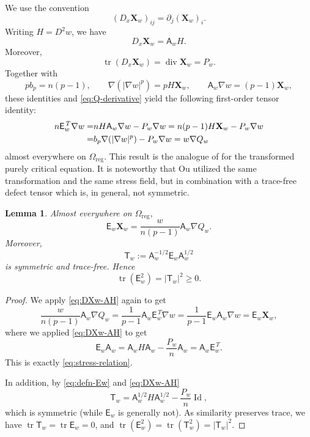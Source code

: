 \documentclass[reqno,12pt]{amsart}
\numberwithin{equation}{section}
\newtheorem{lem}[thm]{Lemma}
\theoremstyle{remark}
\newcommand{\tr}{\operatorname{tr}}
\newcommand{\Id}{\operatorname{Id}}
\newcommand{\Xbf}{\mathbf X}
\begin{document}
We use the convention
$$
(D_x\Xbf_w)_{ij}=\partial_j(\Xbf_w)_i.
$$
Writing $H=D^2w$, we have
\begin{equation}\label{eq:DXw-AH}
D_x\Xbf_w=\mathsf A_w H.
\end{equation}
Moreover,
$$
\operatorname{tr}(D_x\Xbf_w) =\operatorname{div}\Xbf_w=P_w.
$$
Together with
$$
p b_p=n(p-1),\qquad \nabla(|\nabla w|^p)=pH\Xbf_w,\qquad
\mathsf A_w\nabla w=(p-1)\Xbf_w,
$$
these identities and \eqref{eq:Q-derivative} yield the following first-order tensor identity:
\begin{align}
n\mathsf E_w^{\,T}\nabla w = & {} n H \mathsf A_w \nabla w-P_w\nabla w =n(p-1)H\Xbf_w -P_w\nabla w \notag\\
= & {} b_p \nabla(|\nabla w|^p)-P_w\nabla w  ={w}\nabla Q_w \label{eq:Ou-form}
\end{align}
almost everywhere on $\Omega_{\mathrm{reg}}$.
This result is the analogue of \cite[Lemma 2.1 (i)]{O2025} for the transformed purely critical equation. It is noteworthy that Ou utilized the same transformation and the same stress field, but in combination with a trace-free defect tensor which is, in general, not symmetric.

\begin{lem} \label{lem:stress-relation}
Almost everywhere on $\Omega_{\mathrm{reg}}$,
\begin{equation}\label{eq:stress-relation}
\mathsf E_w\Xbf_w =\frac{w}{n(p-1)}\mathsf A_w\nabla Q_w.
\end{equation}
Moreover,
\begin{equation}\label{eq:defn-Tw}
\mathsf T_w:=\mathsf A_w^{-1/2} \mathsf E_w\mathsf A_w^{1/2}
\end{equation}
is symmetric and trace-free.  Hence
\begin{equation}\label{eq:E-square-positive}
\tr(\mathsf E_w^2)=|\mathsf T_w|^2\ge0.
\end{equation}
\end{lem}
\begin{proof}
We apply  \eqref{eq:DXw-AH} again to get
$$
\frac{w}{n(p-1)}\mathsf A_w\nabla Q_w
= \frac1{p-1} \mathsf A_w\mathsf E_w^{\,T}\nabla w
= \frac1{p-1} \mathsf E_w\mathsf A_w\nabla w
= \mathsf E_w\Xbf_w,
$$
where we applied \eqref{eq:DXw-AH} to get
$$
\mathsf E_w\mathsf A_w=\mathsf A_wH\mathsf A_w - \frac{P_w} n \mathsf A_w=\mathsf A_w\mathsf E_w^{\,T}.
$$
This is exactly \eqref{eq:stress-relation}. 

In addition, by \eqref{eq:defn-Ew} and \eqref{eq:DXw-AH}
$$
 \mathsf T_w  =\mathsf A_w^{1/2}H\mathsf A_w^{1/2}-\frac{P_w}{n}\Id,
$$
which is symmetric (while $\mathsf E_w$ is generally not).  As similarity preserves trace, we have $\tr\mathsf T_w=\tr\mathsf E_w=0$, and
$\tr(\mathsf E_w^2)=\tr(\mathsf T_w^2)=|\mathsf T_w|^2$.
\end{proof}
\end{document}
